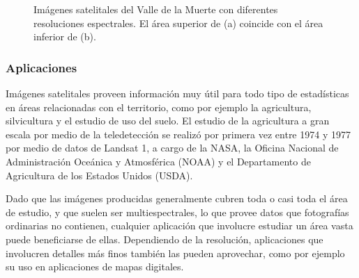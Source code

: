 \begin{figure}
    \centering
    \qquad
    \caption{Imágenes satelitales del Valle de la Muerte con diferentes resoluciones espectrales. El área superior de (a) coincide con el área inferior de (b).}
    \label{fig:1}
\end{figure}

\subsubsection{Aplicaciones}

Imágenes satelitales proveen información muy útil para todo tipo de estadísticas en áreas relacionadas con el territorio, como por ejemplo la agricultura, silvicultura y el estudio de uso del suelo. El estudio de la agricultura a gran escala por medio de la teledetección se realizó por primera vez entre 1974 y 1977 por medio de datos de Landsat 1, a cargo de la NASA, la Oficina Nacional de Administración Oceánica y Atmosférica (NOAA) y el Departamento de Agricultura de los Estados Unidos (USDA). \autocite{allen-usda-study}

Dado que las imágenes producidas generalmente cubren toda o casi toda el área de estudio, y que suelen ser multiespectrales, lo que provee datos que fotografías ordinarias no contienen, cualquier aplicación que involucre estudiar un área vasta puede beneficiarse de ellas. Dependiendo de la resolución, aplicaciones que involucren detalles más finos también las pueden aprovechar, como por ejemplo su uso en aplicaciones de mapas digitales.

